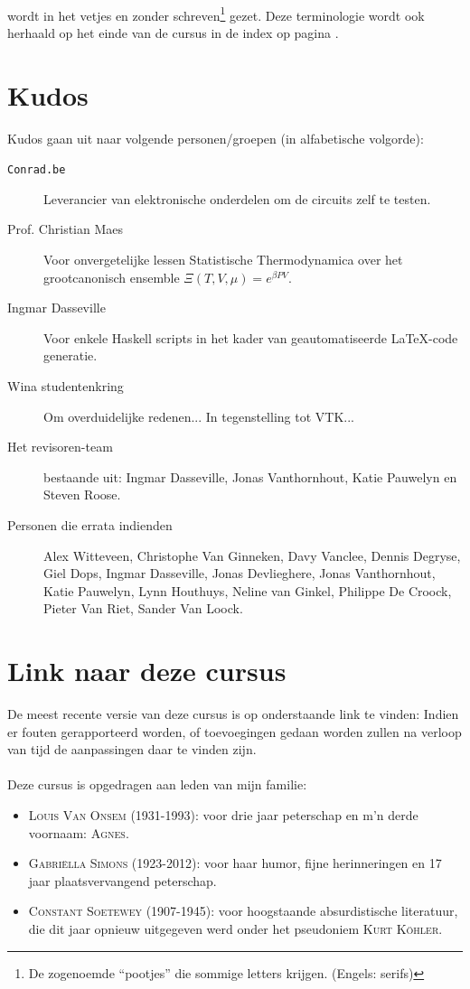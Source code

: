 \documentclass[a4paper,10pt,titlepage]{book}
\begin{document}
\begin{it}
\paragraph{}
 wordt in het vetjes en zonder schreven\footnote{De zogenoemde ``pootjes'' die sommige letters krijgen. (Engels: serifs)} gezet. Deze terminologie wordt ook herhaald op het einde van de cursus in de index op pagina \pageref{idx}.
\section*{Kudos}
Kudos gaan uit naar volgende personen/groepen (in alfabetische volgorde):
\begin{description}
 \item[\texttt{Conrad.be}] Leverancier van elektronische onderdelen om de circuits zelf te testen.
 \item[Prof. Christian Maes] Voor onvergetelijke lessen Statistische Thermodynamica over het grootcanonisch ensemble $\Xi\left(T,V,\mu\right)=e^{\beta PV}$.
 \item[Ingmar Dasseville] Voor enkele Haskell scripts in het kader van geautomatiseerde \LaTeX-code generatie.
 \item[Wina studentenkring] Om overduidelijke redenen... In tegenstelling tot VTK...
 \item[Het revisoren-team] bestaande uit: Ingmar Dasseville, Jonas Vanthornhout, Katie Pauwelyn en Steven Roose.
 \item[Personen die errata indienden] Alex Witteveen, Christophe Van Ginneken, Davy Vanclee, Dennis Degryse, Giel Dops, Ingmar Dasseville, Jonas Devlieghere, Jonas Vanthornhout, Katie Pauwelyn, Lynn Houthuys, Neline van Ginkel, Philippe De Croock, Pieter Van Riet, Sander Van Loock.
\end{description}
\section*{Link naar deze cursus}
De meest recente versie van deze cursus is op onderstaande link te vinden:
Indien er fouten gerapporteerd worden, of toevoegingen gedaan worden zullen na verloop van tijd de aanpassingen daar te vinden zijn.
\paragraph{}Deze cursus is opgedragen aan leden van mijn familie:
\begin{itemize}
 \item \textsc{Louis Van Onsem (1931-1993)}: voor drie jaar peterschap en m'n derde voornaam: \textsc{Agnes}.%
 \item \textsc{Gabri\"ella Simons (1923-2012)}: voor haar humor, fijne herinneringen en 17 jaar plaatsvervangend peterschap.
 \item \textsc{Constant Soetewey (1907-1945)}: voor hoogstaande absurdistische literatuur, die dit jaar opnieuw uitgegeven werd\cite{Kohler} onder het pseudoniem \textsc{Kurt K\"ohler}.
\end{itemize}
\end{it}
\end{document}
